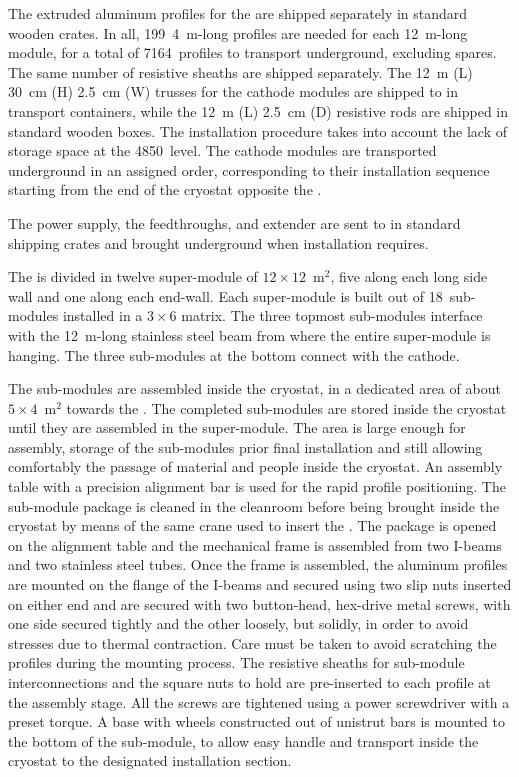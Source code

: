 The extruded aluminum profiles for the  are shipped separately in standard wooden crates.
In all, 199~4~m-long profiles are needed for each 12~m-long  module, for a total of 7164~profiles to transport underground, excluding spares.
The same number of resistive sheaths are shipped separately.
The 12~m (L) 30~cm (H) 2.5~cm (W) trusses for the cathode modules are shipped to  in transport containers, while the 12~m (L) 2.5~cm (D) resistive rods are shipped in standard wooden boxes.
The installation procedure takes into account the lack of storage space at the 4850~level.
The cathode modules are transported underground in an assigned order, corresponding to their installation sequence starting from the end of the cryostat opposite the .

The power supply, the  feedthroughs, and  extender are sent to  in standard shipping crates and brought underground when installation requires.

The  is divided in twelve super-module of $12\times12$~m$^2$, five along each long side wall and one along each end-wall.
Each super-module is built out of 18~sub-modules installed in a $3 \times 6$ matrix.
The three topmost sub-modules interface with the 12~m-long stainless steel beam from where the entire super-module is hanging.
The three sub-modules at the bottom connect with the cathode.

The  sub-modules are assembled inside the  cryostat, in a dedicated area of about $5 \times 4$~m$^2$ towards the .
The completed sub-modules are stored inside the cryostat until they are assembled in the super-module.
The area is large enough for assembly, storage of the sub-modules prior final installation and still allowing comfortably the passage of material and people inside the cryostat.
An assembly table with a precision alignment bar is used for the rapid profile positioning.
The sub-module package is cleaned in the cleanroom before being brought inside the cryostat by means of the same crane used to insert the .
The package is opened on the alignment table and the mechanical frame is assembled from two  I-beams and two stainless steel tubes.
Once the frame is assembled, the aluminum profiles are mounted on the flange of the  I-beams and secured using two slip nuts inserted on either end and are secured with two button-head, hex-drive metal screws, with one side secured tightly and the other loosely, but solidly, in order to avoid stresses due to thermal contraction.
Care must be taken to avoid scratching the profiles during the mounting process.
The resistive sheaths for sub-module interconnections and the square nuts to hold  are pre-inserted to each profile at the assembly stage.
All the screws are tightened using a power screwdriver with a preset torque.
A base with wheels constructed out of unistrut bars is mounted to the bottom of the sub-module, to allow easy handle and transport inside the cryostat to the designated installation section.

